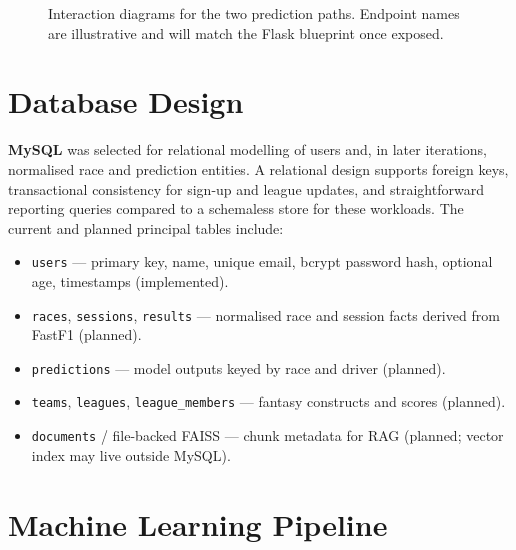 \documentclass[12pt, a4paper, oneside]{report}
\begin{document}
\begin{figure}[H]
\vspace{0.6cm}
 
\noindent
\hfill
{}
\hfill\strut
 
\caption{Interaction diagrams for the two prediction paths.
  Endpoint names are illustrative and will match the Flask blueprint once exposed.}
\label{fig:seq-predict-paths}
\end{figure}
\section{Database Design}

\textbf{MySQL} was selected for relational modelling of users and, in later
iterations, normalised race and prediction entities. A relational design supports
foreign keys, transactional consistency for sign-up and league updates, and
straightforward reporting queries compared to a schemaless store for these
workloads. The current and planned principal tables include:

\begin{itemize}[leftmargin=*]
  \item \texttt{users} --- primary key, name, unique email, bcrypt password hash,
        optional age, timestamps (implemented).
  \item \texttt{races}, \texttt{sessions}, \texttt{results} --- normalised race
        and session facts derived from FastF1 (planned).
  \item \texttt{predictions} --- model outputs keyed by race and driver (planned).
  \item \texttt{teams}, \texttt{leagues}, \texttt{league\_members} --- fantasy
        constructs and scores (planned).
  \item \texttt{documents} / file-backed FAISS --- chunk metadata for RAG
        (planned; vector index may live outside MySQL).
\end{itemize}

\section{Machine Learning Pipeline}
\label{sec:ml-pipeline}
\end{document}
